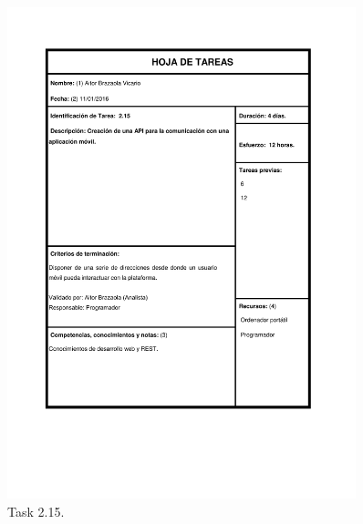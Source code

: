 \documentclass{DeustoFDP}
\begin{document}
\begin{figure}[H]
	\centering
	\includegraphics[width=0.9\textwidth]{fig/Tareas/215}
	\caption{Task 2.15.}
	\label{fig:t215}
\end{figure}
\end{document}
